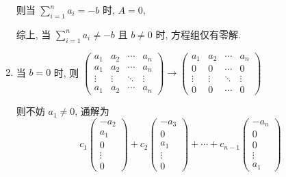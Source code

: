 \begin{enumerate}
			       则当 $\sum_{i=1}^{n} a_{i} = -b$ 时, $A=0$,

			       综上, 当 $\sum_{i=1}^{n} a_{i} \neq -b$ 且 $b \neq 0$ 时, 方程组仅有零解.
			 \item %
			       当 $b=0$ 时, 则 $ \begin{pmatrix}
					       a_{1}  & a_{2}  & \cdots & a_{n}  \\
					       a_{1}  & a_{2}  & \cdots & a_{n}  \\
					       \vdots & \vdots & \ddots & \vdots \\
					       a_{1}  & a_{2}  & \cdots & a_{n}
				       \end{pmatrix} \rightarrow \begin{pmatrix}
					       a_{1}  & a_{2}  & \cdots & a_{n}  \\
					       0      & 0      & \cdots & 0      \\
					       \vdots & \vdots & \ddots & \vdots \\
					       0      & 0      & \cdots & 0
				       \end{pmatrix} $

			       则不妨 $a_{1} \neq 0$, 通解为
			       \[ c_{1}\begin{pmatrix}
					       -a_{2} \\
					       a_{1}  \\
					       0      \\
					       \vdots \\
					       0
				       \end{pmatrix} + c_{2}\begin{pmatrix}
					       -a_{3} \\
					       0      \\
					       a_{1}  \\
					       \vdots \\
					       0
				       \end{pmatrix} + \cdots + c_{n-1}\begin{pmatrix}
					       -a_{n} \\
					       0      \\
					       0      \\
					       \vdots \\
					       a_{1}
				       \end{pmatrix} \]


\end{enumerate}
